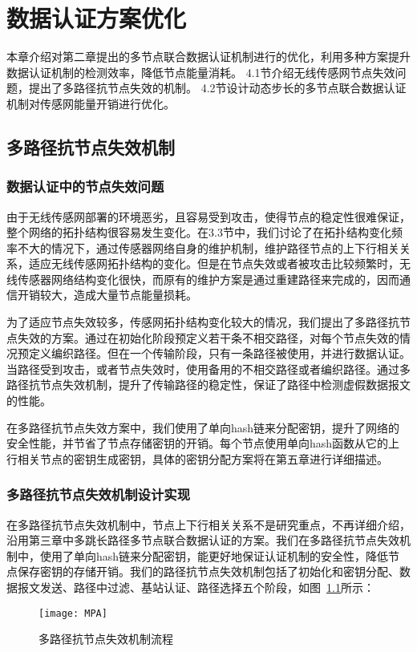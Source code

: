 \chapter{数据认证方案优化}
本章介绍对第二章提出的多节点联合数据认证机制进行的优化，利用多种方案提升数据认证机制的检测效率，降低节点能量消耗。
4.1节介绍无线传感网节点失效问题，提出了多路径抗节点失效的机制。
4.2节设计动态步长的多节点联合数据认证机制对传感网能量开销进行优化。
\section{多路径抗节点失效机制}
\subsection{数据认证中的节点失效问题}
由于无线传感网部署的环境恶劣，且容易受到攻击，使得节点的稳定性很难保证，整个网络的拓扑结构很容易发生变化。在3.3节中，我们讨论了在拓扑结构变化频率不大的情况下，通过传感器网络自身的维护机制，维护路径节点的上下行相关关系，适应无线传感网拓扑结构的变化。但是在节点失效或者被攻击比较频繁时，无线传感器网络结构变化很快，而原有的维护方案是通过重建路径来完成的，因而通信开销较大，造成大量节点能量损耗。

为了适应节点失效较多，传感网拓扑结构变化较大的情况，我们提出了多路径抗节点失效的方案。通过在初始化阶段预定义若干条不相交路径，对每个节点失效的情况预定义编织路径。但在一个传输阶段，只有一条路径被使用，并进行数据认证。当路径受到攻击，或者节点失效时，使用备用的不相交路径或者编织路径。通过多路径抗节点失效机制，提升了传输路径的稳定性，保证了路径中检测虚假数据报文的性能。

在多路径抗节点失效方案中，我们使用了单向hash链来分配密钥，提升了网络的安全性能，并节省了节点存储密钥的开销。每个节点使用单向hash函数从它的上行相关节点的密钥生成密钥，具体的密钥分配方案将在第五章进行详细描述。
\subsection{多路径抗节点失效机制设计实现}
在多路径抗节点失效机制中，节点上下行相关关系不是研究重点，不再详细介绍，沿用第三章中多跳长路径多节点联合数据认证的方案。我们在多路径抗节点失效机制中，使用了单向hash链来分配密钥，能更好地保证认证机制的安全性，降低节点保存密钥的存储开销。我们的路径抗节点失效机制包括了初始化和密钥分配、数据报文发送、路径中过滤、基站认证、路径选择五个阶段，如图~\ref{fig:MPA}所示：
\begin{figure}[htbp]
  \centering
  \texttt{[image: MPA]}
  \caption{多路径抗节点失效机制流程}
  \label{fig:MPA}
\end{figure}
